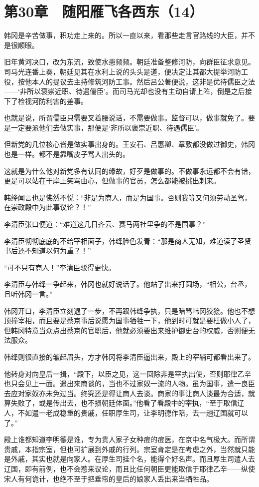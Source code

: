 \section{第30章　随阳雁飞各西东（14）}

韩冈是辛苦做事，积功走上来的。所以一直以来，看那些走言官路线的大臣，并不是很顺眼。

旧年黄河决口，改为东流，致使水患频频。朝廷准备整修河防，向群臣征求意见。司马光连番上奏，朝廷见其在水利上说的头头是道，便决定让其都大提举河防工役，按他本人的提议去主持修筑河防工事。然后吕公著便说，这非是优待儒臣之法——‘非所以褒崇近职、待遇儒臣’。而司马光却也没有主动自请上阵，倒是之后接下了检视河防利害的差事。

也就是说，所谓儒臣只需要叉着腰说话，不需要做事。监督可以，做事就免了。要是一定要派他们去做实事，那便是‘非所以褒崇近职、待遇儒臣’。

但新党的几位核心皆是做实事出身的。王安石、吕惠卿、章敦都没做过御史，韩冈也是一样。都不是靠嘴皮子骂人出头的。

这就是为什么他对新党多有认同的缘故，好歹是做事的。不做事永远都不会有错，更是可以站在干岸上笑骂由心，但做事的官员，怎么都能被挑出刺来。

韩绛闻言也是怫然不悦：“非是为商人，而是为国事。否则我等又何须劳动圣驾，在崇政殿中为此事议论？！”

李清臣张口便道：“难道这几日齐云、赛马两社里争的不是国事？”

李清臣彻彻底底的不给宰相面子，韩绛脸色发青：“那是商人无知，难道读了圣贤书后还不知道以何为重？！”

“可不只有商人！”李清臣驳得更快。

李清臣与韩绛一争起来，韩冈也就好说话了。他站了出来打圆场，“相公，台丞，且听韩冈一言。”

韩冈开口，李清臣立刻退了一步，不再跟韩绛争执，只是暗骂韩冈狡狯。他也不想顶撞宰相，而且要是蔡京事后说愿为国事牺牲一下，他到时可就是要枉做小人了，但韩冈特意当众点出蔡京的官职后，他就必须要出来维护御史台的权威，否则便无法服众。

韩绛则很直接的皱起眉头，方才韩冈将李清臣逼出来，殿上的宰辅可都看出来了。

他转身对向皇后一揖，“殿下，以臣之见，这一回除非是宰执出使，否则耶律乙辛也只会见上一面。遣出来商谈的，当也不过家奴一流的人物。虽为国事，遣一良臣去应对家奴亦未免过当。终究还是得让商人去谈。商家的事让商人谈最为合适，就算失败了，或是传出去，也不损朝廷体面。”他看了看殿中的宰执，“至于取信辽人，不如遣一老成稳重的贵戚，任职厚生司，让李明德作陪，去一趟辽国就可以了。”

殿上谁都知道李明德是谁，专为贵人家子女种痘的痘医，在京中名气极大。而所谓贵戚，本指宗室，但也可扩展到外戚的行列。宗室肯定是在考虑之外，当然就只能是外戚，其实也就是向家人。在厚生司挂个名，能得个好名声。而且厚生司遣人去辽国，即有前例，也不会惹来议论，而且比任何朝臣更能取信于耶律乙辛——纵使宋人有何诡计，也绝不至于把垂帘的皇后的娘家人丢出来当牺牲品。

